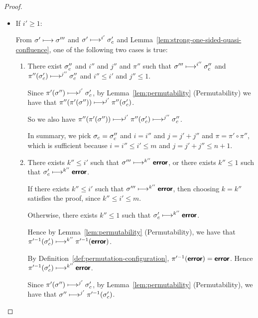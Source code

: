 \begin{proof}
\begin{enumerate}
\begin{itemize}
    \item If $i' \geq 1$:

      From $\sigma' \longmapsto \sigma'''$ and $\sigma' \longmapsto^{i'}
      \sigma_c'$ and Lemma~\ref{lem:strong-one-sided-quasi-confluence},
      one of the following two cases is true:
      \begin{enumerate}
        \item There exist $\sigma_c''$ and $i''$ and $j''$ and $\pi''$
          such that $\sigma''' \longmapsto^{i''} \sigma_c''$ and
          $\pi''(\sigma_c') \longmapsto^{j''} \sigma_c''$ and $i'' \leq
          i'$ and $j'' \leq 1$.

          Since $\pi'(\sigma'') \longmapsto^{j'} \sigma'_c$, by
          Lemma~\ref{lem:permutability} (Permutability) we have that
          $\pi''(\pi'(\sigma'')) \longmapsto^{j'} \pi''(\sigma'_c)$.

          So we also have $\pi''(\pi'(\sigma'')) \longmapsto^{j'}
          \pi''(\sigma'_c) \longmapsto^{j''} \sigma_c''$.

          In summary, we pick $\sigma_c = \sigma_c''$ and $i = i''$ and $j =
          j' + j''$ and $\pi = \pi' \circ \pi''$, which is sufficient
          because $i = i'' \leq i' \leq m$ and $j = j' + j'' \leq n + 1$.

        \item There exists $k'' \leq i'$ such that $\sigma'''
          \longmapsto^{k''} \textbf{\textsf{error}}$, or there exists $k'' \leq 1$ such
          that $\sigma'_c \longmapsto^{k''} \textbf{\textsf{error}}$.

          If there exists $k'' \leq i'$ such that $\sigma'''
          \longmapsto^{k''} \textbf{\textsf{error}}$, then choosing $k = k''$ satisfies
          the proof, since $k'' \leq i' \leq m$.

          Otherwise, there exists $k'' \leq 1$ such
          that $\sigma'_c \longmapsto^{k''} \textbf{\textsf{error}}$.

          Hence by Lemma~\ref{lem:permutability} (Permutability), we
          have that $\pi'^{-1}(\sigma'_c) \longmapsto^{k''}
          \pi'^{-1}(\textbf{\textsf{error}})$.

          By Definition~\ref{def:permutation-configuration},
          $\pi'^{-1}(\textbf{\textsf{error}}) = \textbf{\textsf{error}}$.  Hence
          $\pi'^{-1}(\sigma'_c) \longmapsto^{k''} \textbf{\textsf{error}}$.

          Since $\pi'(\sigma'') \longmapsto^{j'} \sigma_c'$, by
          Lemma~\ref{lem:permutability} (Permutability), we have that
          $\sigma'' \longmapsto^{j'} \pi'^{-1}(\sigma_c')$.


\end{enumerate}
\end{itemize}
\end{enumerate}
\end{proof}
